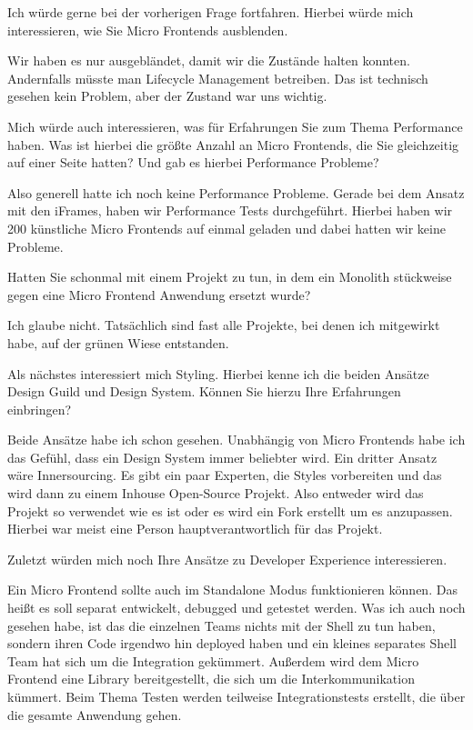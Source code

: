 \begin{description}
    \NicoVogel Ich würde gerne bei der vorherigen Frage fortfahren. Hierbei würde mich interessieren, wie Sie Micro Frontends ausblenden.


    \ManfredSteyer Wir haben es nur ausgebländet, damit wir die Zustände halten konnten. Andernfalls müsste man Lifecycle Management betreiben. Das ist technisch gesehen kein Problem, aber der Zustand war uns wichtig.

    \NicoVogel Mich würde auch interessieren, was für Erfahrungen Sie zum Thema Performance haben. Was ist hierbei die größte Anzahl an Micro Frontends, die Sie gleichzeitig auf einer Seite hatten? Und gab es hierbei Performance Probleme?

    \ManfredSteyer Also generell hatte ich noch keine Performance Probleme. Gerade bei dem Ansatz mit den iFrames, haben wir Performance Tests durchgeführt. Hierbei haben wir 200 künstliche Micro Frontends auf einmal geladen und dabei hatten wir keine Probleme.

    \NicoVogel Hatten Sie schonmal mit einem Projekt zu tun, in dem ein Monolith stückweise gegen eine Micro Frontend Anwendung ersetzt wurde?

    \ManfredSteyer Ich glaube nicht. Tatsächlich sind fast alle Projekte, bei denen ich mitgewirkt habe, auf der grünen Wiese entstanden.

    \NicoVogel Als nächstes interessiert mich Styling. Hierbei kenne ich die beiden Ansätze Design Guild und Design System. Können Sie hierzu Ihre Erfahrungen einbringen?

    \ManfredSteyer Beide Ansätze habe ich schon gesehen. Unabhängig von Micro Frontends habe ich das Gefühl, dass ein Design System immer beliebter wird. Ein dritter Ansatz wäre Innersourcing. Es gibt ein paar Experten, die Styles vorbereiten und das wird dann zu einem Inhouse Open-Source Projekt. Also entweder wird das Projekt so verwendet wie es ist oder es wird ein Fork erstellt um es anzupassen. Hierbei war meist eine Person hauptverantwortlich für das Projekt.

    \NicoVogel Zuletzt würden mich noch Ihre Ansätze zu Developer Experience interessieren.

    \ManfredSteyer Ein Micro Frontend sollte auch im Standalone Modus funktionieren können. Das heißt es soll separat entwickelt, debugged und getestet werden. Was ich auch noch gesehen habe, ist das die einzelnen Teams nichts mit der Shell zu tun haben, sondern ihren Code irgendwo hin deployed haben und ein kleines separates Shell Team hat sich um die Integration gekümmert. Außerdem wird dem Micro Frontend eine Library bereitgestellt, die sich um die Interkommunikation kümmert. Beim Thema Testen werden teilweise Integrationstests erstellt, die über die gesamte Anwendung gehen.


\end{description}
